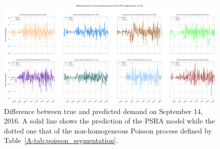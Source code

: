 \documentclass[final,review]{elsarticle}
\begin{document}
\begin{figure}
    \includegraphics[width=\textwidth]{prediction_last_day}
    \caption{Difference between true and predicted demand on September 14, 2016. A solid line shows the prediction of the \acs{PSRA} model while the dotted one that of the non-homogeneous Poisson process defined by Table~\ref{A-tab:poisson_segmentation}.}\label{fig:pred_last_day}
\end{figure}
\end{document}
